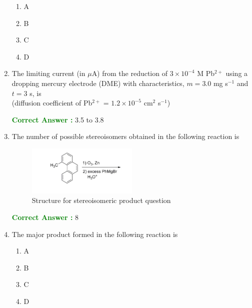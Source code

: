 \documentclass[journal,12pt,onecolumn]{exam}
\theoremstyle{remark}
\newcommand{\correct}{\textcolor{correctgreen}{\checkmark}}
\newcommand{\wrong}{\textcolor{wrongred}{\ding{55}}} %
\begin{document}
\begin{enumerate}
\begin{multicols}{2}
\begin{enumerate}[leftmargin=*, align=left]
    \item \wrong A
    \item \correct B
    \item \wrong C
    \item \wrong D
\end{enumerate}
\end{multicols}


\item
The limiting current (in $\mu$A) from the reduction of $3 \times 10^{-4}$ M Pb$^{2+}$ using a dropping mercury electrode (DME) with characteristics, $m = 3.0$ mg s$^{-1}$ and $t = 3$ s, is \\
(diffusion coefficient of Pb$^{2+}$ = $1.2 \times 10^{-5}$ cm$^2$ s$^{-1}$)

\hfill{}

\textcolor{green}{\textbf{Correct Answer :}} 3.5 to 3.8







\item
The number of possible stereoisomers obtained in the following reaction is
\begin{figure}[H]
\centering
\includegraphics[width=0.5\textwidth]{figs/image5.jpg}
\caption{Structure for stereoisomeric product question}
\label{fig:q56}
\end{figure}

\hfill{}

\textcolor{green}{\textbf{Correct Answer :}} 8


\item
The major product formed in the following reaction is

\hfill{}

\begin{multicols}{2}
\begin{enumerate}[leftmargin=*, align=left]
    \item \wrong A
    \item \wrong B
    \item \wrong C
    \item \correct D
\end{enumerate}
\end{multicols}



\end{enumerate}
\end{document}
